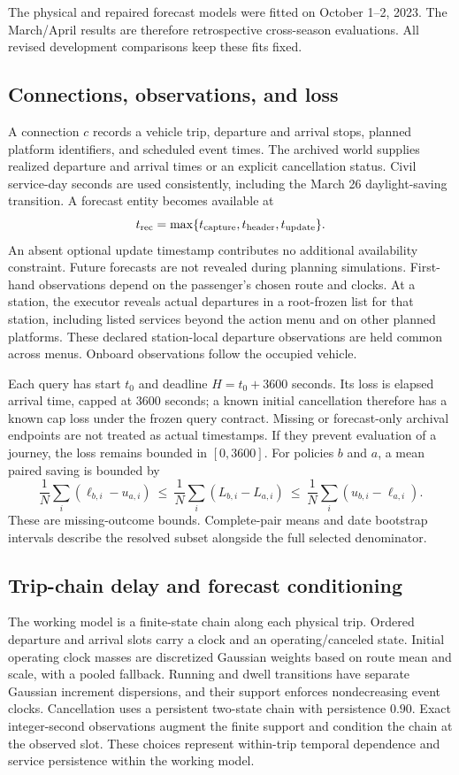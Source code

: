 \documentclass[preprint,12pt,authoryear]{elsarticle}
\begin{document}
The physical and repaired forecast models were fitted on October 1--2, 2023.
The March/April results are therefore retrospective cross-season evaluations.
All revised development comparisons keep these fits fixed.

\subsection{Connections, observations, and loss}
A connection $c$ records a vehicle trip, departure and arrival stops, planned
platform identifiers, and scheduled event times. The archived world supplies
realized departure and arrival times or an explicit cancellation status. Civil
service-day seconds are used consistently, including the March 26 daylight-saving
transition. A forecast entity becomes available at
\[
 t_{\rm rec}=\max\{t_{\rm capture},t_{\rm header},t_{\rm update}\}.
\]
An absent optional update timestamp contributes no additional availability
constraint. Future forecasts are not revealed during planning simulations.
First-hand observations depend on the passenger's chosen route and clocks.
At a station, the executor reveals actual departures in a root-frozen list for
that station, including listed services beyond the action menu and on other
planned platforms. These declared station-local departure observations are
held common across menus. Onboard observations follow the occupied vehicle.

Each query has start $t_0$ and deadline $H=t_0+3600$ seconds. Its loss is elapsed
arrival time, capped at $3600$ seconds; a known initial cancellation therefore
has a known cap loss under the frozen query contract. Missing or forecast-only
archival endpoints are not treated as actual timestamps. If they prevent
evaluation of a journey, the loss remains bounded in $[0,3600]$.
For policies $b$ and $a$, a mean paired saving is bounded by
\begin{equation}
\frac1N\sum_i(\ell_{b,i}-u_{a,i})
\ \le\ \frac1N\sum_i(L_{b,i}-L_{a,i})
\ \le\ \frac1N\sum_i(u_{b,i}-\ell_{a,i}).
\label{eq:missing}
\end{equation}
These are missing-outcome bounds. Complete-pair means and date bootstrap intervals
describe the resolved subset alongside the full selected denominator.

\subsection{Trip-chain delay and forecast conditioning}
The working model is a finite-state chain along each physical trip. Ordered
departure and arrival slots carry a clock and an operating/canceled state.
Initial operating clock masses are discretized Gaussian weights based on route
mean and scale, with a pooled fallback. Running and dwell transitions have
separate Gaussian increment dispersions, and their support enforces nondecreasing
event clocks. Cancellation uses a persistent two-state chain with persistence
$0.90$. Exact integer-second observations augment the finite support and condition
the chain at the observed slot. These choices represent within-trip temporal
dependence and service persistence within the working model.
\end{document}
